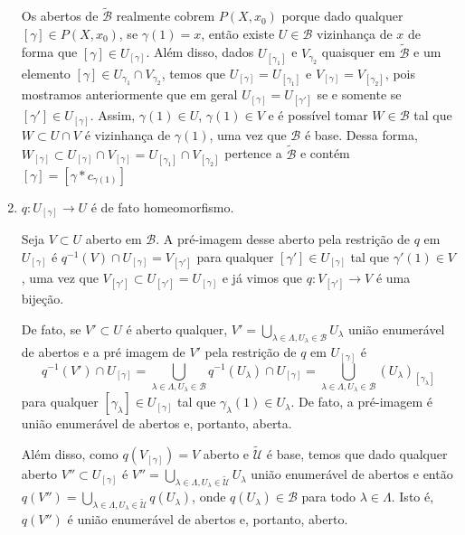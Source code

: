 \begin{dem}
\begin{enumerate}
        Os abertos de $\tilde{\mathcal{B}}$ realmente cobrem $P(X,x_0)$ porque dado qualquer $[\gamma]\in P(X,x_0)$, se $\gamma(1)=x$, então existe $U\in \mathcal{B}$ vizinhança de $x$ de forma que $[\gamma]\in U_{[\gamma]}$.
        Além disso, dados $U_{[\gamma_1]} $ e $V_{\gamma_2}$ quaisquer em $\tilde{\mathcal{B}}$ e um elemento $[\gamma]\in U_{\gamma_1}\cap V_{\gamma_2}$, temos que $U_{[\gamma]}= U_{[\gamma_1]}$ e $V_{[\gamma]}=V_{[\gamma_2]}$, pois mostramos anteriormente que em geral $U_{[\gamma]}=U_{[\gamma']}$ se e somente se $[\gamma']\in U_{[\gamma]}$. Assim, $\gamma(1)\in U$, $\gamma(1)\in V$ e é possível tomar $W\in \mathcal{B}$ tal que $W\subset U\cap V$ é vizinhança de $\gamma(1)$, uma vez que $\mathcal{B}$ é base. Dessa forma, $W_{[\gamma]}\subset U_{[\gamma]}\cap V_{[\gamma]}=U_{[\gamma_1]}\cap V_{[\gamma_2]}$ pertence a $\tilde{\mathcal{B}}$ e contém $[\gamma]=[\gamma*c_{\gamma(1)}]$\newline
         

         \item $q:U_{[\gamma]}\rightarrow U$ é de fato homeomorfismo.\newline
         
            Seja $V\subset U$ aberto em $\mathcal{B}$. A pré-imagem desse aberto pela restrição de $q$ em $U_[\gamma]$ é $q^{-1}(V)\cap U_{[\gamma]}= V_{[\gamma']}$ para qualquer $[\gamma']\in U_{[\gamma]}$ tal que $\gamma'(1)\in V$, uma vez que $V_{[\gamma']} \subset U_{[\gamma']}=U_{[\gamma]}$ e já vimos que $q:V_{[\gamma']}\rightarrow V$ é uma bijeção. 
            
            De fato, se $V'\subset U$ é aberto qualquer, $V'=\underset{\lambda\in \Lambda, U_\lambda\in \mathcal{B}}{\bigcup} U_\lambda$ união enumerável de abertos e a pré imagem de $V'$ pela restrição de $q$ em $U_{[\gamma]}$ é $$q^{-1}(V')\cap U_{[\gamma]} =\underset{\lambda\in \Lambda, U_\lambda\in \mathcal{B}}{\bigcup} q^{-1}(U_\lambda)\cap U_{[\gamma]} = \underset{\lambda\in \Lambda, U_\lambda\in \mathcal{B}}{\bigcup} (U_\lambda)_{[\gamma_\lambda]}$$ para qualquer $[\gamma_\lambda]\in U_{[\gamma]}$ tal que $\gamma_\lambda(1)\in U_\lambda$. De fato, a pré-imagem é união enumerável de abertos e, portanto, aberta.
            
            
            Além disso, como $q(V_{[\gamma]})=V$ aberto e $\tilde{\mathcal{U}}$ é base, temos que dado qualquer aberto $V''\subset U_{[\gamma]}$ é $V''=\underset{\lambda \in \Lambda, U_\lambda \in \tilde{\mathcal{U}}}{\bigcup} U_\lambda$ união enumerável de abertos e então $q(V'')=\underset{\lambda \in \Lambda, U_\lambda \in \tilde{\mathcal{U}}}{\bigcup} q(U_\lambda)$, onde $q(U_\lambda)\in \mathcal{B}$ para todo $\lambda \in \Lambda$. Isto é, $q(V'')$ é união enumerável de abertos e, portanto, aberto.\newline


\end{enumerate}
\end{dem}
